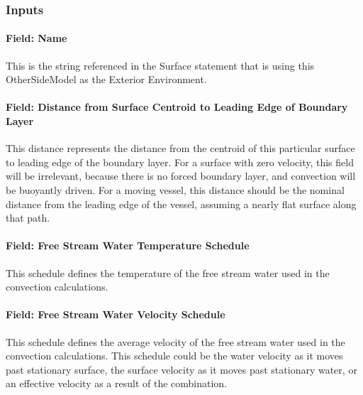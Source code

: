 \subsubsection{Inputs}\label{surfacepropertyunderwater-inputs}

\paragraph{Field: Name}\label{surfacepropertyunderwater-inputs-name}

This is the string referenced in the Surface statement that is using this OtherSideModel as the Exterior Environment.

\paragraph{Field: Distance from Surface Centroid to Leading Edge of Boundary Layer}\label{surfacepropertyunderwater-inputs-boundarylayerdistance}

This distance represents the distance from the centroid of this particular surface to leading edge of the boundary layer.
For a surface with zero velocity, this field will be irrelevant, because there is no forced boundary layer, and convection will be buoyantly driven.
For a moving vessel, this distance should be the nominal distance from the leading edge of the vessel, assuming a nearly flat surface along that path.

\paragraph{Field: Free Stream Water Temperature Schedule}\label{surfacepropertyunderwater-inputs-temperatureschedule}

This schedule defines the temperature of the free stream water used in the convection calculations.

\paragraph{Field: Free Stream Water Velocity Schedule}\label{surfacepropertyunderwater-inputs-velocityschedule}

This schedule defines the average velocity of the free stream water used in the convection calculations.
This schedule could be the water velocity as it moves past stationary surface, the surface velocity as it moves past stationary water, or an effective velocity as a result of the combination.


